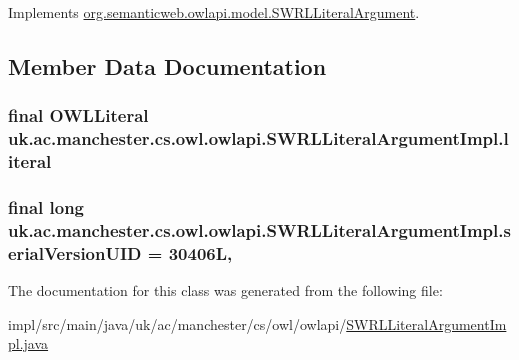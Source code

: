 Implements \hyperlink{interfaceorg_1_1semanticweb_1_1owlapi_1_1model_1_1_s_w_r_l_literal_argument_a4064982d27a6619b391c423b318376cf}{org.\-semanticweb.\-owlapi.\-model.\-S\-W\-R\-L\-Literal\-Argument}.



\subsection{Member Data Documentation}
\hypertarget{classuk_1_1ac_1_1manchester_1_1cs_1_1owl_1_1owlapi_1_1_s_w_r_l_literal_argument_impl_abb5feeffba3b08ef31fcd4bfc45caab0}{
\subsubsection[{literal}]{\setlength{\rightskip}{0pt plus 5cm}final {\bf O\-W\-L\-Literal} uk.\-ac.\-manchester.\-cs.\-owl.\-owlapi.\-S\-W\-R\-L\-Literal\-Argument\-Impl.\-literal\hspace{0.3cm}{\ttfamily [private]}}}\label{classuk_1_1ac_1_1manchester_1_1cs_1_1owl_1_1owlapi_1_1_s_w_r_l_literal_argument_impl_abb5feeffba3b08ef31fcd4bfc45caab0}
\hypertarget{classuk_1_1ac_1_1manchester_1_1cs_1_1owl_1_1owlapi_1_1_s_w_r_l_literal_argument_impl_ae6a0861d868cf4d6d1ea2dcad73c3f43}{
\subsubsection[{serial\-Version\-U\-I\-D}]{\setlength{\rightskip}{0pt plus 5cm}final long uk.\-ac.\-manchester.\-cs.\-owl.\-owlapi.\-S\-W\-R\-L\-Literal\-Argument\-Impl.\-serial\-Version\-U\-I\-D = 30406\-L\hspace{0.3cm}{\ttfamily [static]}, {\ttfamily [private]}}}\label{classuk_1_1ac_1_1manchester_1_1cs_1_1owl_1_1owlapi_1_1_s_w_r_l_literal_argument_impl_ae6a0861d868cf4d6d1ea2dcad73c3f43}


The documentation for this class was generated from the following file\-:\begin{DoxyCompactItemize}
\item 
impl/src/main/java/uk/ac/manchester/cs/owl/owlapi/\hyperlink{_s_w_r_l_literal_argument_impl_8java}{S\-W\-R\-L\-Literal\-Argument\-Impl.\-java}\end{DoxyCompactItemize}
